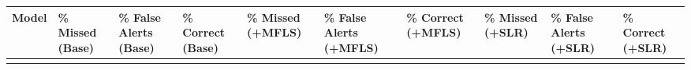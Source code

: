 \documentclass[
  11pt,
]{article}
\newcounter{none} %
\begin{document}
{\def\LTcaptype{none} %
\begin{longtable}[]{@{}
  >{\raggedright\arraybackslash}p{}
  >{\raggedleft\arraybackslash}p{}
  >{\raggedleft\arraybackslash}p{}
  >{\raggedleft\arraybackslash}p{}
  >{\raggedleft\arraybackslash}p{}
  >{\raggedleft\arraybackslash}p{}
  >{\raggedleft\arraybackslash}p{}
  >{\raggedleft\arraybackslash}p{}
  >{\raggedleft\arraybackslash}p{}
  >{\raggedleft\arraybackslash}p{}@{}}
\toprule\noalign{}
\begin{minipage}[b]{\linewidth}\raggedright
Model
\end{minipage} & \begin{minipage}[b]{\linewidth}\raggedleft
\% Missed (Base)
\end{minipage} & \begin{minipage}[b]{\linewidth}\raggedleft
\% False Alerts (Base)
\end{minipage} & \begin{minipage}[b]{\linewidth}\raggedleft
\% Correct (Base)
\end{minipage} & \begin{minipage}[b]{\linewidth}\raggedleft
\% Missed (+MFLS)
\end{minipage} & \begin{minipage}[b]{\linewidth}\raggedleft
\% False Alerts (+MFLS)
\end{minipage} & \begin{minipage}[b]{\linewidth}\raggedleft
\% Correct (+MFLS)
\end{minipage} & \begin{minipage}[b]{\linewidth}\raggedleft
\% Missed (+SLR)
\end{minipage} & \begin{minipage}[b]{\linewidth}\raggedleft
\% False Alerts (+SLR)
\end{minipage} & \begin{minipage}[b]{\linewidth}\raggedleft
\% Correct (+SLR)
\end{minipage} \\
\midrule\noalign{}
\endhead
\bottomrule\noalign{}
\endlastfoot

\end{longtable}}
\end{document}
